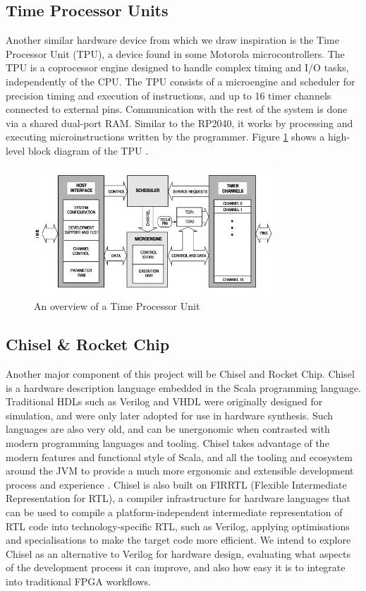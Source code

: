 \documentclass[a4paper,fleqn,12pt]{article}
\begin{document}
\subsection{Time Processor Units}

Another similar hardware device from which we draw inspiration is the Time Processor Unit (TPU), a device found in some Motorola microcontrollers. The TPU is a coprocessor engine designed to handle complex timing and I/O tasks, independently of the CPU. The TPU consists of a microengine and scheduler for precision timing and execution of instructions, and up to 16 timer channels connected to external pins. Communication with the rest of the system is done via a shared dual-port RAM. Similar to the RP2040, it works by processing and executing microinstructions written by the programmer. Figure \ref{fig:tpu} shows a high-level block diagram of the TPU \citep{tpu}.

\begin{figure}[]
    \centering
    \includegraphics[width=0.8\textwidth]{../img/tpu.jpg}
    \caption{An overview of a Time Processor Unit \citep{tpu}}
    \label{fig:tpu}
\end{figure}

\subsection{Chisel \& Rocket Chip}

Another major component of this project will be Chisel and Rocket Chip. Chisel is a hardware description language embedded in the Scala programming language. Traditional HDLs such as Verilog and VHDL were originally designed for simulation, and were only later adopted for use in hardware synthesis. Such languages are also very old, and can be unergonomic when contrasted with modern programming languages and tooling. Chisel takes advantage of the modern features and functional style of Scala, and all the tooling and ecosystem around the JVM to provide a much more ergonomic and extensible development process and experience \citep{chisel}. Chisel is also built on FIRRTL (Flexible Intermediate Representation for RTL), a compiler infrastructure for hardware languages that can be used to compile a platform-independent intermediate representation of RTL code into technology-specific RTL, such as Verilog, applying optimisations and specialisations to make the target code more efficient\citep{firrtl}. We intend to explore Chisel as an alternative to Verilog for hardware design, evaluating what aspects of the development process it can improve, and also how easy it is to integrate into traditional FPGA workflows.
\end{document}
